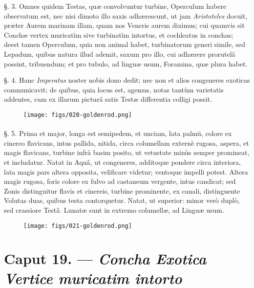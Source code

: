 \documentclass[a4paper, 11pt, oneside, polutonikogreek, german]{article}
\begin{document}
§. 3. Omnes quidem Testas, quæ convolvuntur turbine, Operculum habere observatum est, nec nisi dimoto illo saxis adhærescunt, ut jam \emph{Aristoteles} docuit, præter Aurem marinam illam, quam nos Veneris aurem diximus; cui quamvis sit Conchæ vertex muricatìm sive turbinatìm intortus, et cochleatus in conchas; deest tamen Operculum, quia non animal habet, turbinatorum generi simile, sed Lepadum, quibus natura illud ademit, saxum pro illo, cui adhærere prorutelâ possint, tribuendum; et pro tubulo, ad linguæ usum, Foramina, quæ plura habet.

§. 4. Hanc \emph{Imperatus} noster nobis dono dedit; nec non et alios congeneres exoticas communicavit; de quibus, quia locus est, agemus, notas tantùm varietatis addentes, cum ex illarum picturâ satis Testæ differentia colligi possit.

\begin{figure}[H]
\centering
\texttt{[image: figs/020-goldenrod.png]}

\end{figure}
\paragraph{}
§. 5. Prima et major, longa est semipedem, et unciam, lata palmū, colore ex cinereo flavicans, intus pallida, nitida, circa columellam externè rugosa, aspera, et magis flavicans, turbine infrà basim posito, ut vetustate minùs semper promineat, et includatur. Natat in Aquâ, ut congeneres, additoque pondere circa interiora, lata magis pars altera opposita, velificare videtur; ventoque impelli potest. Altera magis rugosa, foris colore ex fulvo ad castaneum vergente, intus candicat; sed Zonis distinguitur flavis et cinereis, turbine prominente, ex canali, distinguente Volutas duas, quibus testa contorquetur. Natat, ut superior: minor verò duplò, sed crassiore Testâ. Lunatæ sunt in extremo columellæ, ad Linguæ usum.

\begin{figure}[H]
\centering
\texttt{[image: figs/021-goldenrod.png]}

\end{figure}
\paragraph{}
\section{Caput 19. --- \emph{Concha Exotica Vertice muricatim intorto}}
\end{document}
